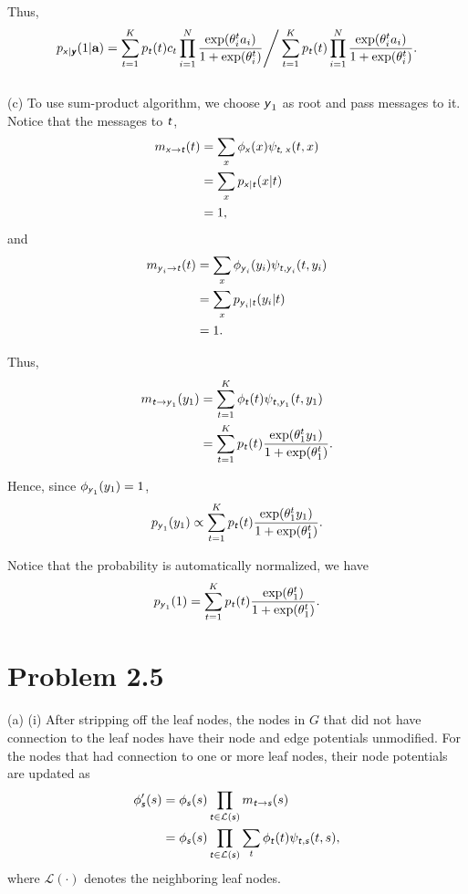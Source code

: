 \documentclass{article}
\newcommand{\s}[1]{\textsf{\textit{#1}}}
\begin{document}
Thus, 
\begin{align*}
p_{\s{x}|\s{\textbf{y}}}(1|\textbf{a}) = \sum_{t=1}^K p_{\s{t}}(t)c_t\prod_{i=1}^{N}\frac{\exp(\theta^t_i a_i)}{1 + \exp(\theta^t_i)} \Bigg/ \sum_{t=1}^K p_{\s{t}}(t)\prod_{i=1}^{N}\frac{\exp(\theta^t_i a_i)}{1 + \exp(\theta^t_i)}.
\end{align*}
\\

%
(c) To use sum-product algorithm, we choose $\s{y}_1$ as root and pass messages to it. Notice that the messages to $\s{t}$,
\begin{align*}
	m_{\s{x}\to\s{t}}(t) &= \sum_x \phi_{\s{x}}(x)\psi_{\s{t, x}}(t, x)\\
	&= \sum_x p_{\s{x}|\s{t}}(x|t)\\
	&=1,
\end{align*}
and
\begin{align*}
	m_{\s{y}_i\to\s{t}}(t) &= \sum_x \phi_{\s{y}_i}(y_i)\psi_{\s{t},\s{y}_i}(t, y_i)\\
	&= \sum_x p_{\s{y}_i|\s{t}}(y_i|t)\\
	&=1.
\end{align*}

Thus, 
\begin{align*}
	m_{\s{t}\to\s{y}_1}(y_1) &= \sum_{t=1}^{K}\phi_{\s{t}}(t)\psi_{\s{t},\s{y}_1}(t, y_1)\\
	&= \sum_{t=1}^{K}p_{\s{t}}(t)\frac{\exp(\theta_1^ty_1)}{1 + \exp(\theta_1^t)}.
\end{align*}

Hence, since  $\phi_{\s{y}_1}(y_1)=1$,
\begin{align*}
	p_{\s{y}_1}(y_1) \propto \sum_{t=1}^{K}p_{\s{t}}(t)\frac{\exp(\theta_1^ty_1)}{1 + \exp(\theta_1^t)}.
\end{align*}

Notice that the probability is automatically normalized, we have
\begin{align*}
	p_{\s{y}_1}(1) = \sum_{t=1}^{K}p_{\s{t}}(t)\frac{\exp(\theta_1^t)}{1 + \exp(\theta_1^t)}.
\end{align*}
%
\pagebreak

\section*{Problem 2.5}
%
(a) (i) After stripping off the leaf nodes, the nodes in $G$ that did not have connection to the leaf nodes have their node and edge potentials unmodified. For the nodes that had connection to one or more leaf nodes, their node potentials are updated as
\begin{align*}
	\phi'_\s{s}(s) &= \phi_\s{s}(s) \prod_{\s{t}\in\mathcal{L}(\s{s})}m_{\s{t}\to\s{s}}(s) \\
	&= \phi_\s{s}(s)\prod_{\s{t}\in\mathcal{L}(\s{s})}\sum_{t}\phi_\s{t}(t)\psi_{\s{t}, \s{s}}(t, s),
\end{align*}
where $\mathcal{L}(\cdot)$ denotes the neighboring leaf nodes.
\\
\end{document}
